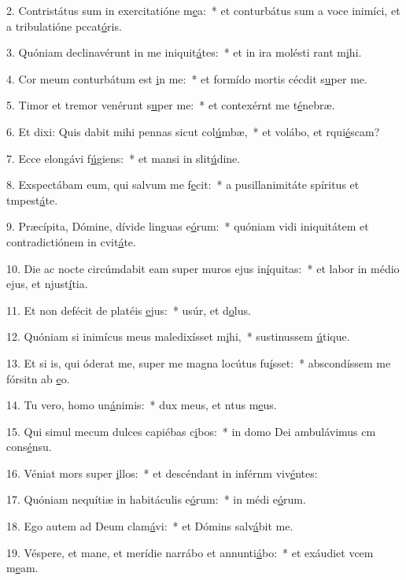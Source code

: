 2. Contristátus sum in exercitatióne m\uline{e}a:~* et conturbátus sum a voce inimíci, et a tribulatióne pccat\uline{ó}ris.\par 
3. Quóniam declinavérunt in me iniquit\uline{á}tes:~* et in ira molésti rant m\uline{i}hi.\par 
4. Cor meum conturbátum est \uline{i}n me:~* et formído mortis cécdit s\uline{u}per me.\par 
5. Timor et tremor venérunt s\uline{u}per me:~* et contexérnt me t\uline{é}nebræ.\par 
6. Et dixi: Quis dabit mihi pennas sicut col\uline{ú}mbæ,~* et volábo, et rqui\uline{é}scam?\par 
7. Ecce elongávi f\uline{ú}giens:~* et mansi in slit\uline{ú}dine.\par 
8. Exspectábam eum, qui salvum me f\uline{e}cit:~* a pusillanimitáte spíritus et tmpest\uline{á}te.\par 
9. Præcípita, Dómine, dívide linguas e\uline{ó}rum:~* quóniam vidi iniquitátem et contradictiónem in cvit\uline{á}te.\par 
10. Die ac nocte circúmdabit eam super muros ejus in\uline{í}quitas:~* et labor in médio ejus, et njust\uline{í}tia.\par 
11. Et non defécit de platéis \uline{e}jus:~* usúr, et d\uline{o}lus.\par 
12. Quóniam si inimícus meus maledixísset m\uline{i}hi,~* sustinussem \uline{ú}tique.\par 
13. Et si is, qui óderat me, super me magna locútus fu\uline{í}sset:~* abscondíssem me fórsitn ab \uline{e}o.\par 
14. Tu vero, homo un\uline{á}nimis:~* dux meus, et ntus m\uline{e}us.\par 
15. Qui simul mecum dulces capiébas c\uline{i}bos:~* in domo Dei ambulávimus cm cons\uline{é}nsu.\par 
16. Véniat mors super \uline{i}llos:~* et descéndant in inférnm viv\uline{é}ntes:\par 
17. Quóniam nequítiæ in habitáculis e\uline{ó}rum:~* in médi e\uline{ó}rum.\par 
18. Ego autem ad Deum clam\uline{á}vi:~* et Dómins salv\uline{á}bit me.\par 
19. Véspere, et mane, et merídie narrábo et annunti\uline{á}bo:~* et exáudiet vcem m\uline{e}am.\par 
